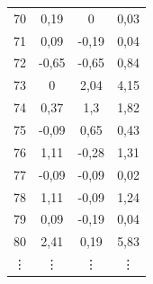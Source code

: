 \documentclass{article}
\begin{document}
\begin{table}[!p]
\begin{minipage}{0.5\textwidth}
{\begin{tabular}{cccc}
    70 &  0,19 &  0    &  0,03 \\
    71 &  0,09 & -0,19 &  0,04 \\
    72 & -0,65 & -0,65 &  0,84 \\
    73 &  0    &  2,04 &  4,15 \\
    74 &  0,37 &  1,3  &  1,82 \\
    75 & -0,09 &  0,65 &  0,43 \\
    76 &  1,11 & -0,28 &  1,31 \\
    77 & -0,09 & -0,09 &  0,02 \\
    78 &  1,11 & -0,09 &  1,24 \\
    79 &  0,09 & -0,19 &  0,04 \\
    80 &  2,41 &  0,19 &  5,83 \\
\vdots & \vdots & \vdots & \vdots  \\ 
\bottomrule
\end{tabular}}

\end{minipage}

\end{table}
\end{document}
